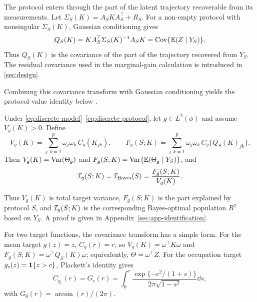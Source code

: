 The protocol enters through the part of the latent trajectory recoverable from
its measurements. Let $\Sigma_S(K)=A_SKA_S^\top+R_S$. For a non-empty protocol
with nonsingular $\Sigma_S(K)$, Gaussian conditioning gives
\begin{equation}
Q_S(K)=KA_S^\top\Sigma_S(K)^{-1}A_SK
      =\operatorname{Cov}\{\mathbb{E}(Z\mid Y_S)\}.
\label{eq:QP}
\end{equation}
Thus $Q_S(K)$ is the covariance of the part of the trajectory recovered from
$Y_S$. The residual covariance used in the marginal-gain calculation is
introduced in \cref{sec:design}.

Combining this covariance transform with Gaussian conditioning yields the
protocol-value identity below \citep{zhang2026label}.

\begin{proposition}
\label{prop:risk-identity}
Under \eqref{eq:discrete-model}--\eqref{eq:discrete-protocol}, let
$g\in L^2(\phi)$ and assume $V_g(K)>0$. Define
\begin{equation}
V_g(K)=\sum_{j,k=1}^p\omega_j\omega_k\,C_g(K_{jk}),
\qquad
F_g(S;K)=\sum_{j,k=1}^p\omega_j\omega_k\,C_g\{Q_S(K)_{jk}\}.
\label{eq:VF}
\end{equation}
Then $V_g(K)=\operatorname{Var}(\Theta_g)$ and
$F_g(S;K)=\operatorname{Var}\{\mathbb{E}(\Theta_g\mid Y_S)\}$, and
\begin{equation}
\mathcal{I}_g(S;K)=\mathcal{I}_{\mathrm{Bayes}}(S)=\frac{F_g(S;K)}{V_g(K)}.
\label{eq:ceiling}
\end{equation}
\end{proposition}

Thus $V_g(K)$ is total target variance, $F_g(S;K)$ is the part explained by
protocol $S$, and $\mathcal{I}_g(S;K)$ is the corresponding Bayes-optimal population
$R^2$ based on $Y_S$. A proof is given in
Appendix~\ref{sec:app-identification}.

For two target functions, the covariance transform has a simple form. For the
mean target $g(z)=z$, $C_g(r)=r$, so
$V_g(K)=\omega^\top K\omega$ and
$F_g(S;K)=\omega^\top Q_S(K)\omega$; equivalently,
$\Theta=\omega^\top Z$. For the occupation target
$g_c(z)=\mathbf{1}\{z>c\}$, Plackett's identity \citep{plackett1954reduction} gives
\begin{equation}
C_{g_c}(r)=G_c(r)
=\int_0^r\frac{\exp\{-c^2/(1+s)\}}{2\pi\sqrt{1-s^2}}\dd s,
\label{eq:plackett}
\end{equation}
with $G_0(r)=\arcsin(r)/(2\pi)$.
